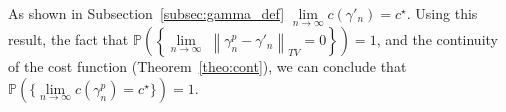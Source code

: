 \documentclass[Afour,sageh,times]{sagej}
\newtheorem{remark}{\bf Remark}
\renewcommand{\qed}{\hfill\blacksquare}
\begin{document}
As shown in Subsection~\ref{subsec:gamma_def} $ \underset{n\rightarrow\infty}{\lim}c(\gamma'_n)=c^\star$.
Using this result, the fact that $\mathbb{P}\left(\left\{\underset{n\rightarrow\infty}{\lim}\;\left\|\gamma^p_{n}-\gamma'_{n}\right\|_{TV}=0\right\}\right)=1$, and the continuity of the cost function (Theorem~\ref{theo:cont}), we can conclude that
      $ \mathbb{P}(\{\underset{n\rightarrow\infty}{\lim}c(\gamma^p_n)=c^\star\})=1. $%
\end{document}
